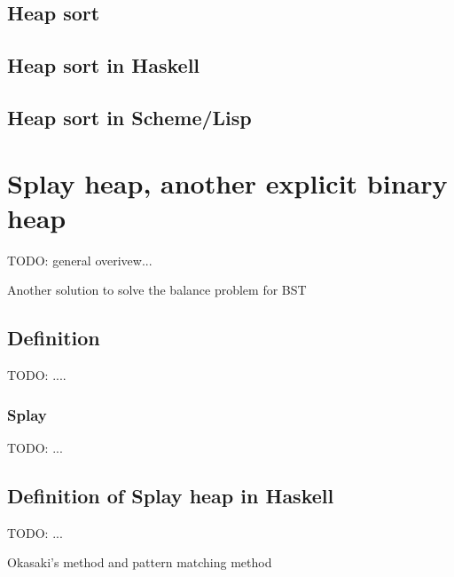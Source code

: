 \documentclass{article}
\begin{document}
\subsection{Heap sort}

\subsection*{Heap sort in Haskell}

\subsection*{Heap sort in Scheme/Lisp}



\section{Splay heap, another explicit binary heap}
\label{splayheap}

TODO: general overivew...

Another solution to solve the balance problem for BST

\subsection{Definition}

TODO: ....

\subsubsection{Splay}

TODO: ...

\subsection*{Definition of Splay heap in Haskell}

TODO: ...

Okasaki's method and pattern matching method
\end{document}
